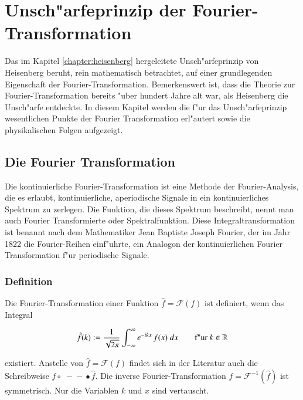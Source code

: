 \chapter{Unsch"arfeprinzip der Fourier-Transformation \label{chapter:heisenbergfourier}}
\begin{refsection}

Das im Kapitel \ref{chapter:heisenberg} hergeleitete Unsch"arfeprinzip von Heisenberg beruht, rein mathematisch betrachtet, auf einer grundlegenden Eigenschaft der Fourier-Transformation. Bemerkenswert ist, dass die Theorie zur Fourier-Transformation bereits "uber hundert Jahre alt war, als Heisenberg die Unsch"arfe entdeckte. In diesem Kapitel werden die f"ur das Unsch"arfeprinzip wesentlichen Punkte der Fourier Transformation erl"autert sowie die physikalischen Folgen aufgezeigt.

\section{Die Fourier Transformation}

Die kontinuierliche Fourier-Transformation ist eine Methode der Fourier-Analysis, die es erlaubt, kontinuierliche, aperiodische Signale in ein kontinuierliches Spektrum zu zerlegen. Die Funktion, die dieses Spektrum beschreibt, nennt man auch Fourier Transformierte oder Spektralfunktion. Diese Integraltransformation ist benannt nach dem Mathematiker Jean Baptiste Joseph Fourier, der im Jahr 1822 die Fourier-Reihen einf"uhrte, ein Analogon der kontinuierlichen Fourier Transformation f"ur periodische Signale.\\

\subsection{Definition}

Die Fourier-Transformation einer Funktion $\hat{f}=\mathcal{F}(f)$ ist definiert, wenn das Integral

\begin{equation}
\hat{f}(k) := \dfrac{1}{\sqrt{2\pi}}\int_{-\infty}^{\infty}e^{-i k x} \, f(x) \; dx \qquad \textnormal{f"ur } k \in \mathbb{R}
\end{equation}

existiert. Anstelle von $\hat{f}=\mathcal{F}(f)$ findet sich in der Literatur auch die Schreibweise $f \circ\;\!\! \!\!-\!\!\!-\!\!\!\bullet \hat{f}$.
Die inverse Fourier-Transformation $f=\mathcal{F}^{-1}(\hat{f})$ ist symmetrisch. Nur die Variablen $k$ und $x$ sind vertauscht.


\end{refsection}
